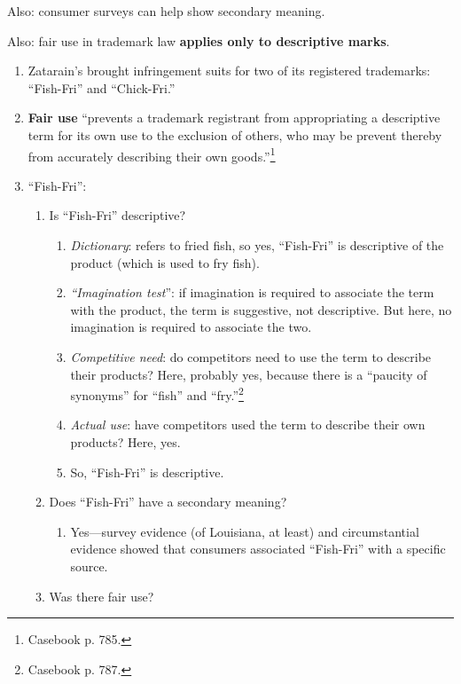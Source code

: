 Also: consumer surveys can help show secondary meaning.

Also: fair use in trademark law \textbf{applies only to descriptive marks}.

\begin{enumerate}
    \item Zatarain's brought infringement suits for two of its registered 
    trademarks: ``Fish-Fri'' and ``Chick-Fri.''
    \item \textbf{Fair use} ``prevents a trademark registrant from 
    appropriating a descriptive term for its own use to the exclusion of 
    others, who may be prevent thereby from accurately describing their own 
    goods.''\footnote{Casebook p. 785.}
    \item ``Fish-Fri'':
    \begin{enumerate}
        \item Is ``Fish-Fri'' descriptive?
        \begin{enumerate}
            \item \emph{Dictionary}: refers to fried fish, so yes, 
            ``Fish-Fri'' is descriptive of the product (which is used to fry 
            fish).
            \item \emph{``Imagination test}'': if imagination is required to 
            associate the term with the product, the term is suggestive, not 
            descriptive. But here, no imagination is required to associate the 
            two.
            \item \emph{Competitive need}: do competitors need to use the term 
            to describe their products? Here, probably yes, because there is a 
            ``paucity of synonyms'' for ``fish'' and 
            ``fry.''\footnote{Casebook p. 787.}
            \item \emph{Actual use}: have competitors used the term to 
            describe their own products? Here, yes.
            \item So, ``Fish-Fri'' is descriptive.
        \end{enumerate}
        \item Does ``Fish-Fri'' have a secondary meaning?
        \begin{enumerate}
            \item Yes---survey evidence (of Louisiana, at least) and 
            circumstantial evidence showed that consumers associated 
            ``Fish-Fri'' with a specific source.
        \end{enumerate}
        \item Was there fair use?

\end{enumerate}
\end{enumerate}
